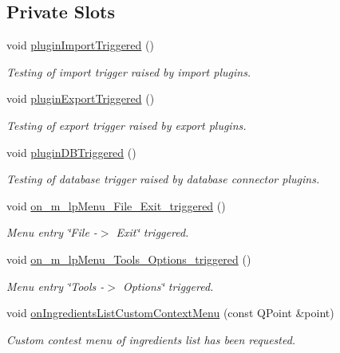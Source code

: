 \subsection*{Private Slots}
\begin{DoxyCompactItemize}
\item 
void \hyperlink{classc_main_window_ab3ff57870f54e4655aef149e9746035a}{plugin\+Import\+Triggered} ()
\begin{DoxyCompactList}\small\item\em Testing of import trigger raised by import plugins. \end{DoxyCompactList}\item 
void \hyperlink{classc_main_window_a203dfd9cd3c6b69acb33695a576907fa}{plugin\+Export\+Triggered} ()
\begin{DoxyCompactList}\small\item\em Testing of export trigger raised by export plugins. \end{DoxyCompactList}\item 
void \hyperlink{classc_main_window_a70fa99ff98426a5cc888a2de3ea83b07}{plugin\+D\+B\+Triggered} ()
\begin{DoxyCompactList}\small\item\em Testing of database trigger raised by database connector plugins. \end{DoxyCompactList}\item 
void \hyperlink{classc_main_window_a3345add8cf20de78da3c67080188608d}{on\+\_\+m\+\_\+lp\+Menu\+\_\+\+File\+\_\+\+Exit\+\_\+triggered} ()
\begin{DoxyCompactList}\small\item\em Menu entry \char`\"{}\+File -\/$>$ Exit\char`\"{} triggered. \end{DoxyCompactList}\item 
void \hyperlink{classc_main_window_a39a2aa4bfa1303da62f3599c77be4762}{on\+\_\+m\+\_\+lp\+Menu\+\_\+\+Tools\+\_\+\+Options\+\_\+triggered} ()
\begin{DoxyCompactList}\small\item\em Menu entry \char`\"{}\+Tools -\/$>$ Options\char`\"{} triggered. \end{DoxyCompactList}\item 
void \hyperlink{classc_main_window_a933380437ebf1ee1abd2be9165f76f68}{on\+Ingredients\+List\+Custom\+Context\+Menu} (const Q\+Point \&point)
\begin{DoxyCompactList}\small\item\em Custom contest menu of ingredients list has been requested. \end{DoxyCompactList}\item 

\end{DoxyCompactItemize}
